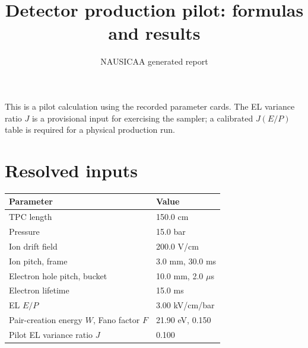 \documentclass[11pt]{article}
\begin{document}
\title{Detector production pilot: formulas and results}
\author{NAUSICAA generated report}
\date{}
\maketitle
\noindent This is a pilot calculation using the recorded parameter cards. The EL variance ratio $J$ is a provisional input for exercising the sampler; a calibrated $J(E/P)$ table is required for a physical production run.
\section*{Resolved inputs}
\begin{tabular}{ll}\toprule Parameter & Value\\\midrule
TPC length & 150.0 cm\\
Pressure & 15.0 bar\\
Ion drift field & 200.0 V/cm\\
Ion pitch, frame & 3.0 mm, 30.0 ms\\
Electron hole pitch, bucket & 10.0 mm, 2.0 $\mu$s\\
Electron lifetime & 15.0 ms\\
EL $E/P$ & 3.00 kV/cm/bar\\
Pair-creation energy $W$, Fano factor $F$ & 21.90 eV, 0.150\\
Pilot EL variance ratio $J$ & 0.100\\
\bottomrule\end{tabular}
\end{document}
